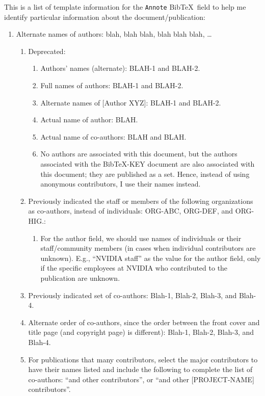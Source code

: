 \documentclass[letter,12pt]{article}
\begin{document}
This is a list of template information for the {\tt Annote} {\sc Bib}\TeX\ field to help me identify particular information about the document/publication: \vspace{-0.3cm}
\begin{enumerate} \itemsep -4pt
\item Alternate names of authors: blah, blah blah, blah blah blah, \dots \vspace{-0.3cm}
	\begin{enumerate} \itemsep -2pt
	\item Deprecated: \vspace{-0.2cm}
		\begin{enumerate} \itemsep -2pt
		\item Authors' names (alternate): BLAH-1 and BLAH-2.
		\item Full names of authors: BLAH-1 and BLAH-2.
		\item Alternate names of $[$Author XYZ$]$: BLAH-1 and BLAH-2.
		\item Actual name of author: BLAH.
		\item Actual name of co-authors: BLAH and BLAH.
		\item No authors are associated with this document, but the authors associated with the BibTeX-KEY document are also associated with this document; they are published as a set. Hence, instead of using anonymous contributors, I use their names instead.
		\end{enumerate}
	\item Previously indicated the staff or members of the following organizations as co-authors, instead of individuals: ORG-ABC, ORG-DEF, and ORG-HIG.: \vspace{-0.2cm}
		\begin{enumerate} \itemsep -2pt
		\item For the author field, we should use names of individuals or their staff/community members (in cases when individual contributors are unknown). E.g., ``NVIDIA staff'' as the value for the author field, only if the specific employees at NVIDIA who contributed to the publication are unknown.
		\end{enumerate}
	\item Previously indicated set of co-authors: Blah-1, Blah-2, Blah-3, and Blah-4.
	\item Alternate order of co-authors, since the order between the front cover and title page (and copyright page) is different): Blah-1, Blah-2, Blah-3, and Blah-4.
	\item For publications that many contributors, select the major contributors to have their names listed and include the following to complete the list of co-authors: ``and other contributors'', or ``and other $[$PROJECT-NAME$]$ contributors''. \vspace{-0.2cm}

\end{enumerate}
\end{enumerate}
\end{document}
